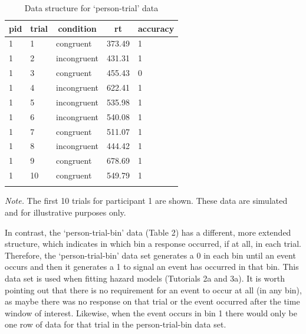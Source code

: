 \documentclass[
  man, donotrepeattitle,floatsintext]{apa6}
\begin{document}
\begin{table}[H]

\begin{center}
\begin{threeparttable}

\caption{\label{tab:ca-data-table}Data structure for `person-trial' data}

\begin{tabular}{lllll}
\toprule
pid & \multicolumn{1}{c}{trial} & \multicolumn{1}{c}{condition} & \multicolumn{1}{c}{rt} & \multicolumn{1}{c}{accuracy}\\
\midrule
1 & 1 & congruent & 373.49 & 1\\
1 & 2 & incongruent & 431.31 & 1\\
1 & 3 & congruent & 455.43 & 0\\
1 & 4 & incongruent & 622.41 & 1\\
1 & 5 & incongruent & 535.98 & 1\\
1 & 6 & incongruent & 540.08 & 1\\
1 & 7 & congruent & 511.07 & 1\\
1 & 8 & incongruent & 444.42 & 1\\
1 & 9 & congruent & 678.69 & 1\\
1 & 10 & congruent & 549.79 & 1\\
\bottomrule
\addlinespace
\end{tabular}

\begin{tablenotes}[para]
\normalsize{\textit{Note.} The first 10 trials for participant 1 are shown. These data are simulated and for illustrative purposes only.}
\end{tablenotes}

\end{threeparttable}
\end{center}

\end{table}

In contrast, the `person-trial-bin' data (Table 2) has a different, more extended structure, which indicates in which bin a response occurred, if at all, in each trial. Therefore, the `person-trial-bin' data set generates a 0 in each bin until an event occurs and then it generates a 1 to signal an event has occurred in that bin. This data set is used when fitting hazard models (Tutorials 2a and 3a). It is worth pointing out that there is no requirement for an event to occur at all (in any bin), as maybe there was no response on that trial or the event occurred after the time window of interest. Likewise, when the event occurs in bin 1 there would only be one row of data for that trial in the person-trial-bin data set.
\end{document}
